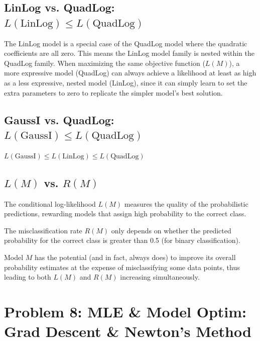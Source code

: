 \documentclass[11pt, a4paper, oneside]{memoir}
\begin{document}
\section[LinLog vs. QuadLog]{LinLog vs. QuadLog: $L(\text{LinLog}) \le L(\text{QuadLog})$}
The LinLog model is a special case of the QuadLog model where the quadratic coefficients are all zero.
This means the LinLog model family is nested within the QuadLog family.
When maximizing the same objective function ($L(M)$),
a more expressive model (QuadLog) can always achieve a likelihood at least as high as a less expressive, nested model (LinLog),
since it can simply learn to set the extra parameters to zero to replicate the simpler model's best solution.

\section[GaussI vs. QuadLog]{GaussI vs. QuadLog: $L(\text{GaussI}) \le L(\text{QuadLog})$}
$L(\text{GaussI}) \le L(\text{LinLog}) \le L(\text{QuadLog})$

\section[L(M) vs R(M)]{$L(M)$ vs. $R(M)$}
The conditional log-likelihood $L(M)$ measures the quality of the probabilistic predictions,
rewarding models that assign high probability to the correct class.

The misclassification rate $R(M)$ only depends on whether the predicted probability for the correct class is greater than 0.5 (for binary classification).

Model $M$ has the potential (and in fact, always does) to improve its overall probability estimates at the expense of misclassifying some data points,
thus leading to both $L(M)$ and $R(M)$ increasing simultaneously.

\chapter{Problem 8: MLE \& Model Optim: Grad Descent \& Newton's Method}
\end{document}

